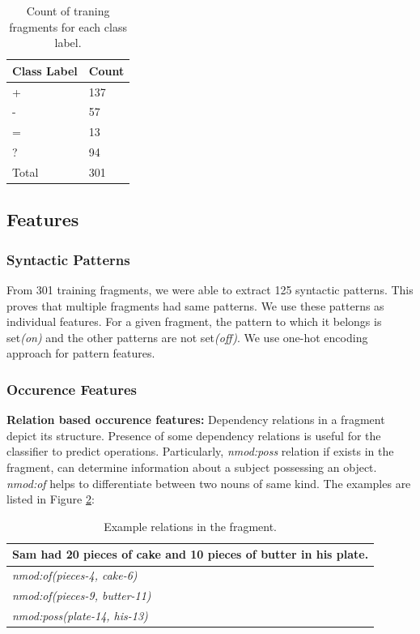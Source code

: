 \documentclass[11pt]{article}
\begin{document}
\begin{table}[h!]
\centering
\begin{tabular}{ | m{6em} | m{6em} |}
\hline
\textbf{Class Label} & \textbf{Count}\\
\hline
+ & 137\\
\hline
- & 57\\
\hline
= & 13\\
\hline
? & 94\\
\hline
Total & 301\\
\hline
\end{tabular}
\caption{Count of traning fragments for each class label.}
\label{fig:trainingdatadistribution}
\end{table}

\subsection {Features}\label{sec:features}

\subsubsection{Syntactic Patterns}\label{sec:featuressyntacticpattern}
From 301 training fragments, we were able to extract 125 syntactic patterns. This proves that multiple fragments had same patterns. We use these patterns as individual features. For a given fragment, the pattern to which it belongs is set\textit{(on)} and the other patterns are not set\textit{(off)}. We use one-hot encoding approach for pattern features.

\subsubsection{Occurence Features}\label{sec:featuresoccurence}

\textbf{Relation based occurence features:} Dependency relations in a fragment depict its structure. Presence of some dependency relations is useful for the classifier to predict operations. Particularly, \textit{nmod:poss} relation if exists in the fragment, can determine information about a subject possessing an object. \textit{nmod:of} helps to differentiate between two nouns of same kind. The examples are listed in Figure \ref{figure:15}:

\begin{table}[h!]
\centering
\begin{tabular}{ | m{25em} | }
\hline
 \textbf{Sam had 20 pieces of cake and 10 pieces of butter in his plate.}\\
\hline
\textit{nmod:of(pieces-4, cake-6)}\\
\hline
\textit{nmod:of(pieces-9, butter-11)}\\
\hline
\textit{nmod:poss(plate-14, his-13)}\\
\hline
\end{tabular}
\caption{Example relations in the fragment.}
\label{figure:15}
\end{table}
\end{document}
